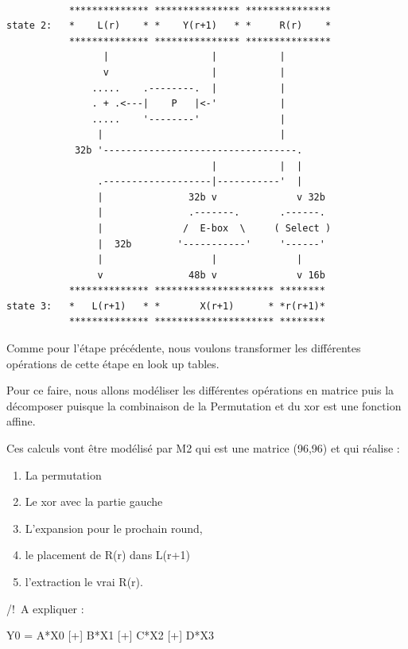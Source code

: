 \documentclass[a4paper,12pt]{article}
\begin{document}
\begin{Verbatim}[samepage=true]

           ************** *************** ***************
state 2:   *    L(r)    * *    Y(r+1)   * *     R(r)    *
           ************** *************** ***************
                 |                  |           |
                 v                  |           |
               .....    .--------.  |           |
               . + .<---|    P   |<-'           |
               .....    '--------'              |
                |                               |
            32b '----------------------------------.
                                    |           |  |
                .-------------------|-----------'  |
                |               32b v              v 32b
                |               .-------.       .------.
                |              /  E-box  \     ( Select )
                |  32b        '-----------'     '------'
                |                   |              |
                v               48b v              v 16b
           ************** ********************* ********
state 3:   *   L(r+1)   * *       X(r+1)      * *r(r+1)*
           ************** ********************* ********

\end{Verbatim}


Comme pour l'étape précédente, nous voulons transformer les différentes opérations de cette étape en look up tables.

Pour ce faire, nous allons modéliser les différentes opérations en matrice puis la décomposer puisque la combinaison de la Permutation et du xor est une fonction affine.

Ces calculs vont être modélisé par M2 qui est une matrice (96,96) et qui réalise :
\begin{enumerate}
\item La permutation
\item Le xor avec la partie gauche
\item L'expansion pour le prochain round,
\item le placement de R(r) dans L(r+1) 
\item l'extraction le vrai R(r).
\end{enumerate}


/!\ A expliquer :

 Y0 = A*X0 [+] B*X1 [+] C*X2 [+] D*X3
\end{document}
